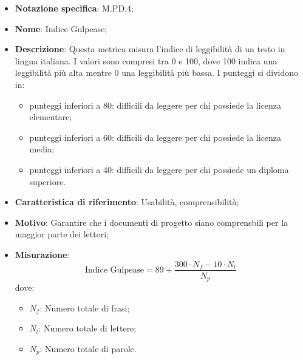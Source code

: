 \begin{itemize}
    \item \textbf{Notazione specifica}: M.PD.4;
    \item \textbf{Nome}: Indice Gulpease;
    \item \textbf{Descrizione}: Questa metrica misura l'indice di leggibilità di un testo in lingua italiana. I valori sono compresi tra 0 e 100, dove 100 indica una leggibilità più alta mentre 0 una leggibilità più bassa. I punteggi si dividono in:
    \begin{itemize}
        \item punteggi inferiori a 80: difficili da leggere per chi possiede la licenza elementare;
        \item punteggi inferiori a 60: difficili da leggere per chi possiede la licenza media;
        \item punteggi inferiori a 40: difficili da leggere per chi possiede un diploma superiore.
    \end{itemize}
    \item \textbf{Caratteristica di riferimento}: Usabilità, comprensibilità;
    \item \textbf{Motivo}: Garantire che i documenti di progetto siano comprensbili per la maggior parte dei lettori;
    \item \textbf{Misurazione}:
    \[
        \text{Indice Gulpease} = 89 + \frac{{300 \cdot {{N_f}} - 10 \cdot {{N_l}}}}{{{{N_p}}}}
    \]
    dove:
    \begin{itemize}
        \item $N_{f}$: Numero totale di frasi;
        \item $N_{l}$: Numero totale di lettere;
        \item $N_{p}$: Numero totale di parole.
    \end{itemize}
\end{itemize}
